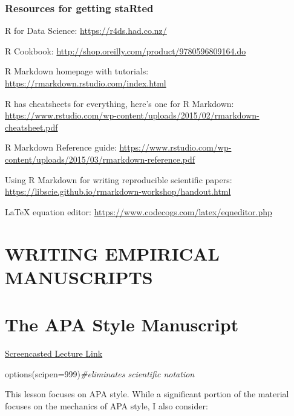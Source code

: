 \documentclass[
  english,
]{book}
\newenvironment{Shaded}{\begin{snugshade}}{\end{snugshade}}
\newcommand{\AttributeTok}[1]{\textcolor[rgb]{0.77,0.63,0.00}{#1}}
\newcommand{\CommentTok}[1]{\textcolor[rgb]{0.56,0.35,0.01}{\textit{#1}}}
\newcommand{\DecValTok}[1]{\textcolor[rgb]{0.00,0.00,0.81}{#1}}
\newcommand{\FunctionTok}[1]{\textcolor[rgb]{0.00,0.00,0.00}{#1}}
\newcommand{\NormalTok}[1]{#1}
\begin{document}
\hypertarget{resources-for-getting-started}{%
\subsection{Resources for getting staRted}\label{resources-for-getting-started}}

R for Data Science: \url{https://r4ds.had.co.nz/}

R Cookbook: \url{http://shop.oreilly.com/product/9780596809164.do}

R Markdown homepage with tutorials: \url{https://rmarkdown.rstudio.com/index.html}

R has cheatsheets for everything, here's one for R Markdown: \url{https://www.rstudio.com/wp-content/uploads/2015/02/rmarkdown-cheatsheet.pdf}

R Markdown Reference guide: \url{https://www.rstudio.com/wp-content/uploads/2015/03/rmarkdown-reference.pdf}

Using R Markdown for writing reproducible scientific papers: \url{https://libscie.github.io/rmarkdown-workshop/handout.html}

LaTeX equation editor: \url{https://www.codecogs.com/latex/eqneditor.php}

\hypertarget{writing-empirical-manuscripts}{%
\chapter*{WRITING EMPIRICAL MANUSCRIPTS}\label{writing-empirical-manuscripts}}

\hypertarget{APAstyle}{%
\chapter{The APA Style Manuscript}\label{APAstyle}}

\href{https://spu.hosted.panopto.com/Panopto/Pages/Viewer.aspx?pid=8ca9d96d-0ff6-4068-a570-ac290189a4d4}{Screencasted Lecture Link}

\begin{Shaded}
\begin{Highlighting}[]
\FunctionTok{options}\NormalTok{(}\AttributeTok{scipen=}\DecValTok{999}\NormalTok{)}\CommentTok{\#eliminates scientific notation}
\end{Highlighting}
\end{Shaded}

This lesson focuses on APA style. While a significant portion of the material focuses on the mechanics of APA style, I also consider:
\end{document}
